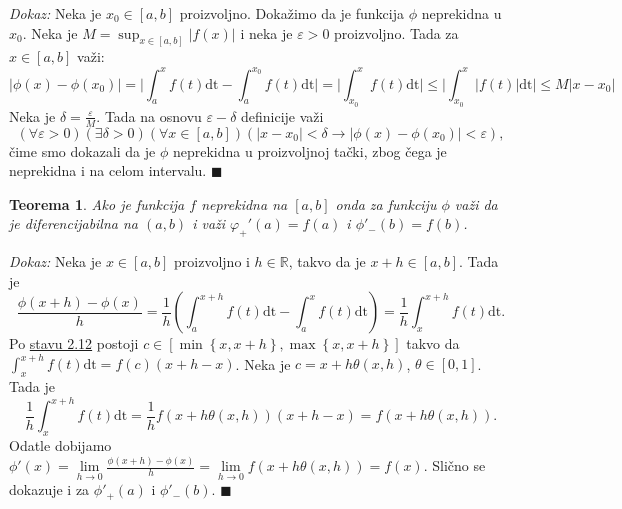 \documentclass{article}
\newtheorem{teorema}{Teorema}[section]
\begin{document}
\textit{Dokaz:} Neka je $x_0 \in \left[a ,b\right]$ proizvoljno.
Dokažimo da je funkcija $\phi$ neprekidna u $x_0$.
Neka je $M = \displaystyle \sup_{x\in\left[a,b\right]} | f\left(x\right) |$ i neka je $\varepsilon > 0$
proizvoljno. Tada za $x\in\left[a,b\right]$ važi:
\begin{equation*}
    \displaystyle |\phi\left(x\right) - \phi\left(x_0\right)| = \bigg|\int^x_a f\left(t\right)\text{dt} - \int^{x_0}_a f\left(t\right)\text{dt}\bigg| = \bigg|\int^x_{x_0}f\left(t\right)\text{dt}\bigg| \leq \bigg|\int^x_{x_0}|f\left(t\right)|\text{dt}\bigg| \leq M|x - x_0|
\end{equation*}
Neka je $\delta=\frac{\varepsilon}{M}$. Tada na osnovu $\varepsilon - \delta$ definicije važi
$$    \displaystyle \left(\forall \varepsilon > 0\right)\left(\exists \delta > 0\right)\left(\forall x\in \left[a, b\right]\right)\left(|x-x_0| < \delta \longrightarrow |\phi\left(x\right) - \phi\left(x_0\right)| < \varepsilon\right),$$
čime smo dokazali da je $\phi$ neprekidna u proizvoljnoj tački, zbog čega je neprekidna i na celom intervalu.
\null\hfill $\blacksquare$\par

\begin{teoremabox}
    \label{teorema_2.8}
    \begin{teorema}
        Ako je funkcija $f$ neprekidna na $\left[a, b\right]$ onda za funkciju $\phi$
        važi da je diferencijabilna na $\left(a,b\right)$ i važi $\varphi_+'\left(a\right) = f\left(a\right)$ i $\phi'_-\left(b\right) = f\left(b\right)$.
    \end{teorema}
\end{teoremabox}

\textit{Dokaz:} Neka je $x \in \left[a, b\right]$ proizvoljno i $h \in \mathbb{R}$,
takvo da je $x+h\in\left[a,b\right]$. Tada je
$$    \frac{\phi\left(x+h\right) - \phi\left(x\right)}{h}  = \frac{1}{h} \left( \int^{x+h}_a f\left(t\right)\text{dt} - \int^x_a f\left(t\right)\text{dt}\right) = \frac{1}{h} \int^{x+h}_x f\left(t\right)\text{dt}.$$
Po \hyperref[stav_2.12]{stavu 2.12} postoji $c\in\left[\min\left\{x, x+h\right\}, \max\left\{x, x+h\right\}\right]$ takvo da
$\displaystyle\int^{x+h}_x f\left(t\right)\text{dt}=f\left(c\right)\left(x+h-x\right)$.
Neka je $c=x+h\theta\left(x,h\right)$, $\theta\in\left[0,1\right]$. Tada je
$$ \frac{1}{h} \int^{x+h}_x f\left(t\right)\text{dt}=\frac{1}{h} f\left(x+h\theta\left(x,h\right)\right)\left(x+h-x\right)=f\left(x+h\theta\left(x,h\right)\right).$$
Odatle dobijamo $\displaystyle \phi'\left(x\right) =\lim\limits_{h\longrightarrow 0}\frac{\phi\left(x+h\right) - \phi\left(x\right)}{h} = \lim\limits_{h\longrightarrow 0} f\left(x+h\theta\left(x, h\right)\right)= f\left(x\right)$.
Slično se dokazuje i za $\phi'_+\left(a\right)$ i $\phi'_-\left(b\right)$.
\null\hfill $\blacksquare$\par
\end{document}
